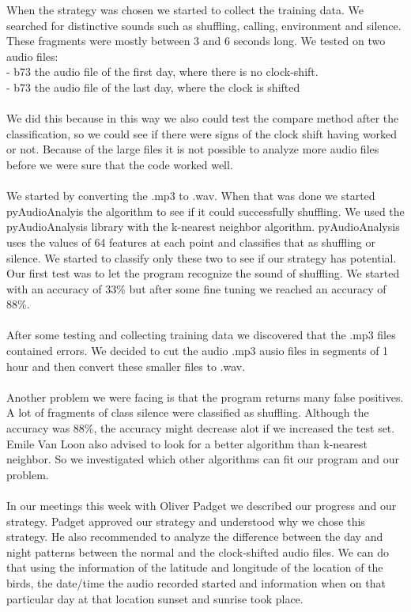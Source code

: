 \documentclass[a4paper]{article}
\begin{document}
When the strategy was chosen we started to collect the training data. We searched for distinctive sounds such as shuffling, calling, environment and silence. These fragments were mostly between 3 and  6 seconds long. We tested on two audio files:\\
- b73 the audio file of the first day, where there is no clock-shift. \\
- b73 the audio file of the last day, where the clock is shifted\\\\
We did this because in this way we also could test the compare method after the classification, so we could see if there were signs of the clock shift having worked or not. Because of the large files it is not possible to analyze more audio files before we were sure that the code worked well.\\\\
We started by converting the .mp3 to .wav. When that was done we started pyAudioAnalyis the algorithm to see if it could successfully shuffling. We used the pyAudioAnalysis library with the k-nearest neighbor algorithm. pyAudioAnalysis uses the values of 64 features at each point and classifies that as shuffling or silence. We started to classify only these two to see if our strategy has potential.  Our first test was to let the program recognize the sound of shuffling. We started with an accuracy of 33\% but after some fine tuning we reached an accuracy of 88\%.\\\\
After some testing and collecting training data we discovered that the .mp3 files contained errors. We decided to cut the audio .mp3 ausio files in segments of 1 hour and then convert these smaller files to .wav.\\\\
Another problem we were facing is that the program returns many false positives. A lot of fragments of class silence were classified as shuffling. Although the accuracy was 88\%, the accuracy might decrease alot if we increased the test set. Emile Van Loon also advised to look for a better algorithm than k-nearest neighbor. So we investigated which other algorithms can fit our program and our problem.\\\\
In our meetings this week with Oliver Padget we described our progress and our strategy. Padget approved our strategy and understood why we chose this strategy. He also recommended to analyze the difference between the day and night patterns between the normal and the clock-shifted audio files. We can do that using the information of the latitude and longitude of the location of the birds, the date/time the audio recorded started and information when on that particular day at that location sunset and sunrise took place.\\\\
\end{document}

